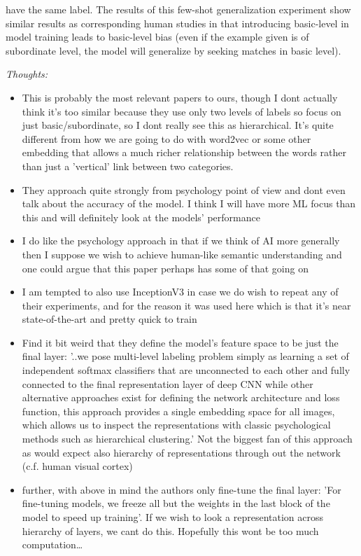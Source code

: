 \documentclass{report}
\begin{document}
have the same label. The results of this few-shot generalization experiment show similar results as corresponding human studies \cite{Xu2000} in that introducing basic-level in model training leads to basic-level bias (even if the example given is of subordinate level, the model will generalize by seeking matches in basic level).

\textit{Thoughts:}
\begin{itemize}
    \item This is probably the most relevant papers to ours, though I dont actually think it's too similar because they use only two levels of labels so focus on just basic/subordinate, so I dont really see this as hierarchical. It's quite different from how we are going to do with word2vec or some other embedding that allows a much richer relationship between the words rather than just a 'vertical' link between two categories.
    \item They approach quite strongly from psychology point of view and dont even talk about the accuracy of the model. I think I will have more ML focus than this and will definitely look at the models' performance
    \item I do like the psychology approach in that if we think of AI more generally then I suppose we wish to achieve human-like semantic understanding and one could argue that this paper perhaps has some of that going on
    \item I am tempted to also use InceptionV3 in case we do wish to repeat any of their experiments, and for the reason it was used here which is that it's near state-of-the-art and pretty quick to train
    \item Find it bit weird that they define the model's feature space to be just the final layer: '..we pose multi-level labeling problem simply as learning a set of independent softmax classifiers that are unconnected to each other and fully connected to the final representation layer of deep CNN  while other alternative approaches exist for defining the network architecture and loss function, this approach provides a single embedding space for all images, which allows us to inspect the representations with classic psychological methods such as hierarchical clustering.' Not the biggest fan of this approach as would expect also hierarchy of representations through out the network (c.f. human visual cortex)
   \item further, with above in mind the authors only fine-tune the final layer: 'For fine-tuning models, we freeze all but the weights in the last block of the model to speed up training'. If we wish to look a representation across hierarchy of layers, we cant do this. Hopefully this wont be too much computation\dots

\end{itemize}
\end{document}
